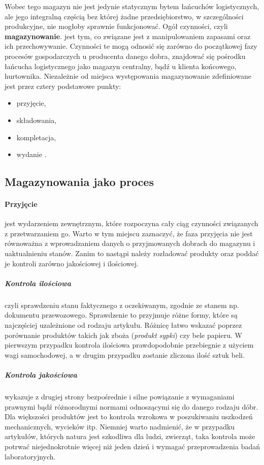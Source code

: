 	Wobec tego magazyn nie jest jedynie statycznym bytem łańcuchów logistycznych, ale jego integralną
	częścią bez której żadne przedsiębiorstwo, w szczególności produkcyjne, nie mogłoby sprawnie
	funkcjonować. Ogół czynności, czyli \textbf{magazynowanie}. jest tym, co związane jest z manipulowaniem
	zapasami oraz ich przechowywanie. Czynności te mogą odnosić się zarówno do początkowej fazy procesów gospodarczych
	u producenta danego dobra, znajdować się pośrodku łańcucha logistycznego jako magazyn centralny, bądź u klienta
	końcowego, hurtownika. Niezależnie od miejsca występowania magazynowanie zdefiniowane jest przez cztery
	podstawowe punkty: 
	\begin{itemize}
		\item przyjęcie,
		\item składowania,
		\item kompletacja,
		\item wydanie \cite{PZMW}\cite{PL_FM}.
	\end{itemize}
	
	\subsection{Magazynowania jako proces}
		\paragraph{Przyjęcie} jest wydarzeniem zewnętrznym, które rozpoczyna cały ciąg czynności 
		związany\-ch z przetwarzaniem go. Warto w tym miejscu zaznaczyć, że faza przyjęcia nie jest 
		równoważna z wprowadzaniem danych o przyjmowanych dobrach do magazynu i uaktualnieniu stanów. 
		Zanim to nastąpi należy rozładować produkty oraz poddać je kontroli zarówno jakościowej i ilościowej.
			\subparagraph{Kontrola ilościowa} czyli sprawdzeniu stanu faktycznego z oczekiwanym, 
			zgodnie ze \-stanem np. dokumentu przewozowego. 
			Sprawdzenie to przyjmuje różne formy, które są najczęściej uzależnione od rodzaju artykułu. 
			Różnicę łatwo wskazać
			poprzez porównanie produktów takich jak zboża (\textit{produkt sypki}) czy bele papieru. 
			W pierwszym przypadku 
			kontrola ilościowa prawdopodobnie przebiegnie z użyciem wagi samochodowej, a w drugim przypadku 
			zostanie zliczona
			ilość sztuk beli.  
			\subparagraph{Kontrola jakościowa} wykazuje z drugiej strony bezpośrednie i silne powiązanie z wymaganiami prawnymi bądź
			różnorodnymi normami odnoszącymi się do danego rodzaju dóbr. Dla większości produktów jest to kontrola
			wzrokowa w poszukiwaniu uszkodzeń mechanicznych, wycieków itp. Niemniej warto nadmienić, że w przypadku
			artykułów, których natura jest szkodliwa dla ludzi, zwierząt, taka kontrola może potrwać niejednokrotnie
			więcej niż jeden dzień i wymagać przeprowadzenia badań laboratoryjnych.
